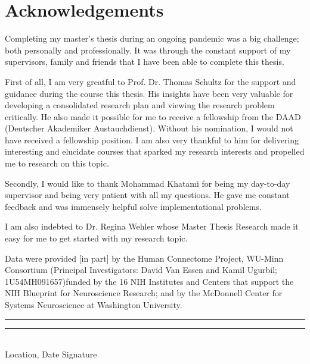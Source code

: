 
\chapter{Acknowledgements}
\thispagestyle{empty}
\noindent%
Completing my master's thesis during an ongoing pandemic was a big challenge; both personally and professionally. It was through the constant support of my supervisors, family and friends that I have been able to complete this thesis. 

First of all, I am very greatful to Prof. Dr. Thomas Schultz for the support and guidance during the course this thesis. His insights have been very valuable for developing a consolidated research plan and viewing the research problem critically. He also made it possible for me to receive a fellowship from the DAAD (Deutscher Akademiker Austauchdienst). Without his nomination, I would not have received a fellowship position. I am also very thankful to him for delivering interesting and elucidate courses that sparked my research interests and propelled me to research on this topic.

Secondly, I would like to thank Mohammad Khatami for being my day-to-day supervisor and being very patient with all my questions. He gave me constant feedback and was immensely helpful solve implementational problems. 

I am also indebted to Dr. Regina Wehler whose Master Thesis Research made it easy for me to get started with my research topic.

Data were provided [in part] by the Human Connectome Project, WU-Minn Consortium (Principal Investigators: David Van Essen and Kamil Ugurbil; 1U54MH091657)funded by the 16 NIH Institutes and Centers that support the NIH Blueprint for Neuroscience Research; and by the McDonnell Center for Systems Neuroscience at Washington University. 
\vfill
\noindent%
\rule[1em]{8em}{0.5pt}  \hfill \rule[1em]{8em}{0.5pt}\\ %
Location, Date \hfill Signature\\

